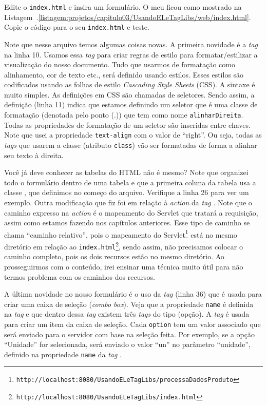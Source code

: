 Edite o \texttt{index.html} e insira um formulário. O meu ficou como mostrado na Listagem~\thechapter.\ref{listagem:projetos/capitulo03/UsandoELeTagLibs/web/index.html}. Copie o código para o seu \texttt{index.html} e teste. 


Note que nesse arquivo temos algumas coisas novas. A primeira novidade é a \textit{tag}  na linha 10. Usamos essa \textit{tag} para criar regras de estilo para formatar/estilizar a visualização do nosso documento. Tudo que usarmos de formatação como alinhamento, cor de texto etc., será definido usando estilos. Esses estilos são codificados usando as folhas de estilo \textit{Cascading Style Sheets} (CSS). A sintaxe é muito simples. As definições em CSS são chamadas de seletores. Sendo assim, a definição  (linha 11) indica que estamos definindo um seletor que é uma classe de formatação (denotada pelo ponto (.)) que tem como nome \texttt{alinharDireita}. Todas as propriedades de formatação de um seletor são inseridas entre chaves. Note que usei a propriedade \texttt{text-align} com o valor de ``right''. Ou seja, todas as \textit{tags} que usarem a classe (atributo \texttt{class})  vão ser formatadas de forma a alinhar seu texto à direita.

Você já deve conhecer as tabelas do HTML não é mesmo? Note que organizei todo o formulário dentro de uma tabela e que a primeira coluna da tabela usa a classe , que definimos no começo do arquivo. Verifique a linha 26 para ver um exemplo. Outra modificação que fiz foi em relação à \textit{action} da \textit{tag} . Note que o caminho expresso na \textit{action} é o mapeamento do Servlet que tratará a requisição, assim como estamos fazendo nos capítulos anteriores. Esse tipo de caminho se chama ``caminho relativo'', pois o mapeamento do Servlet\footnote{\texttt{http://localhost:8080/UsandoELeTagLibs/processaDadosProduto}} está no mesmo diretório em relação ao \texttt{index.html}\footnote{\texttt{http://localhost:8080/UsandoELeTagLibs/index.html}}, sendo assim, não precisamos colocar o caminho completo, pois os dois recursos estão no mesmo diretório. Ao prosseguirmos com o conteúdo, irei ensinar uma técnica muito útil para não termos problema com os caminhos dos recursos.

A última novidade no nosso formulário é o uso da \textit{tag}  (linha 36) que é usada para criar uma caixa de seleção (\textit{combo box}). Veja que a propriedade \texttt{name} é definida na \textit{tag}  e que dentro dessa \textit{tag} existem três \textit{tags} do tipo  (opção). A \textit{tag}  é usada para criar um item da caixa de seleção. Cada \texttt{option} tem um valor associado que será enviado para o servidor com base na seleção feita. Por exemplo, se a opção ``Unidade'' for selecionada, será enviado o valor ``un'' no parâmetro ``unidade'', definido na propriedade \texttt{name} da \textit{tag} .

